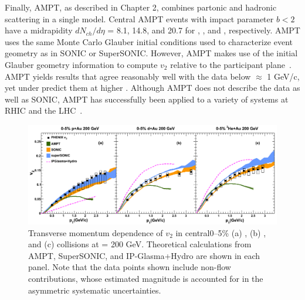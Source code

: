 Finally, AMPT, as described in Chapter 2, combines partonic and hadronic scattering in a single model. Central AMPT events with impact parameter $b<2$ have a midrapidity $dN_{ch}/d\eta$ = 8.1, 14.8, and 20.7 for \pau, \dau, and \hau, respectively. AMPT uses the same Monte Carlo Glauber initial conditions used to characterize event geometry as in SONIC or SuperSONIC. However, AMPT makes use of the initial Glauber geometry information to compute $v_2$ relative to the participant plane~\cite{PhysRevC.92.054903}. AMPT yields results that agree reasonably well with the data below \pt $\approx$ 1 GeV/c, yet under predict them at higher \pt. Although AMPT does not describe the data as well as SONIC, AMPT has successfully been applied to a variety of systems at RHIC and the LHC~\cite{PhysRevC.93.054911}. 

\begin{figure}[!ht]
\begin{center}
\includegraphics[width=1.0\linewidth]{figs/indepth_theory_comparison.png}
\caption{Transverse momentum dependence of $v_2$ in central0--5\% (a) \pau, (b) \dau, and (c) \hau collisions at \sqsn = 200 GeV. Theoretical calculations from AMPT, SuperSONIC, and IP-Glasma+Hydro are shown in each panel. Note that the data points shown include non-flow contributions, whose estimated magnitude is accounted for in the asymmetric systematic uncertainties.}
\label{fig:indepth_comp_three}
\end{center}
\end{figure}

